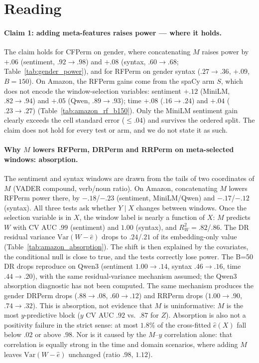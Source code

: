 \documentclass[11pt]{article}
\begin{document}
\section*{Reading}

\paragraph{Claim 1: adding meta-features raises power --- where it holds.}
The claim holds for CFPerm on gender, where concatenating $M$ raises power by $+.06$ (sentiment, $.92\to.98$)
and $+.08$ (syntax, $.60\to.68$; Table~\ref{tab:gender_power}), and for RFPerm on gender syntax
($.27\to.36$, $+.09$, $B{=}150$).
On Amazon, the RFPerm gains come from the spaCy arm $S$, which does not encode the window-selection
variables: sentiment $+.12$ (MiniLM, $.82\to.94$) and $+.05$ (Qwen, $.89\to.93$); time $+.08$
($.16\to.24$) and $+.04$ ($.23\to.27$) (Table~\ref{tab:amazon_rf_b150}).
Only the MiniLM sentiment gain clearly exceeds the cell standard error ($\le .04$) and survives the
ordered split.
The claim does not hold for every test or arm, and we do not state it as such.

\paragraph{Why $M$ lowers RFPerm, DRPerm and RRPerm on meta-selected windows: absorption.}
The sentiment and syntax windows are drawn from the tails of two coordinates of $M$
(VADER compound, verb/noun ratio).
On Amazon, concatenating $M$ lowers RFPerm power there, by $-.18$/$-.23$ (sentiment, MiniLM/Qwen)
and $-.17$/$-.12$ (syntax).
All three tests ask whether $Y\mid X$ changes between windows.
Once the selection variable is in $X$, the window label is nearly a function of $X$:
$M$ predicts $W$ with CV AUC $.99$ (sentiment) and $1.00$ (syntax), and $R^2_W=.82$/$.86$.
The DR residual variance $\mathrm{Var}(W-\hat e)$ drops to $.24$/$.21$ of its embedding-only value
(Table~\ref{tab:amazon_absorption}).
The shift is then explained by the covariates, the conditional null is close to true, and the tests
correctly lose power.
The B=50 DR drops reproduce on Qwen3 (sentiment $1.00\to.14$, syntax $.46\to.16$, time $.44\to.20$), with the
same residual-variance mechanism assumed; the Qwen3 absorption diagnostic has not been computed.
The same mechanism produces the gender DRPerm drops ($.88\to.08$, $.60\to.12$) and RRPerm drops
($1.00\to.90$, $.74\to.32$).
This is absorption, not evidence that $M$ is uninformative:
$M$ is the most $y$-predictive block ($y$ CV AUC $.92$ vs.\ $.87$ for $Z$).
Absorption is also not a positivity failure in the strict sense: at most $1.8\%$ of the
cross-fitted $\hat e(X)$ fall below $.02$ or above $.98$.
Nor is it caused by the $M$--$y$ correlation alone: that correlation is equally strong in the time and
domain scenarios, where adding $M$ leaves $\mathrm{Var}(W-\hat e)$ unchanged (ratio $.98$, $1.12$).
\end{document}
